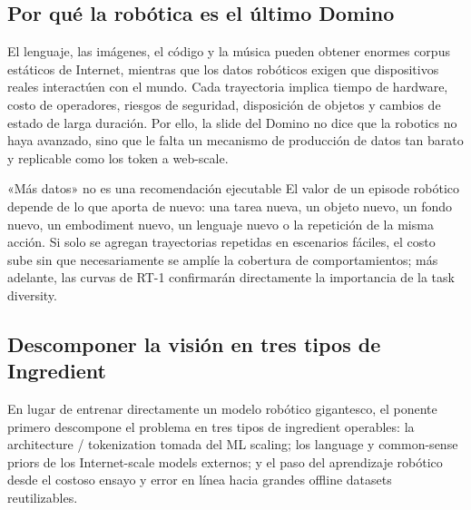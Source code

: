 
\subsection{Por qué la robótica es el último Domino}

El lenguaje, las imágenes, el código y la música pueden obtener enormes corpus estáticos de Internet, mientras que los datos robóticos exigen que dispositivos reales interactúen con el mundo. Cada trayectoria implica tiempo de hardware, costo de operadores, riesgos de seguridad, disposición de objetos y cambios de estado de larga duración. Por ello, la slide del Domino no dice que la robotics no haya avanzado, sino que le falta un mecanismo de producción de datos tan barato y replicable como los token a web-scale.


\begin{warningbox}{«Más datos» no es una recomendación ejecutable}
El valor de un episode robótico depende de lo que aporta de nuevo: una tarea nueva, un objeto nuevo, un fondo nuevo, un embodiment nuevo, un lenguaje nuevo o la repetición de la misma acción. Si solo se agregan trayectorias repetidas en escenarios fáciles, el costo sube sin que necesariamente se amplíe la cobertura de comportamientos; más adelante, las curvas de RT-1 confirmarán directamente la importancia de la task diversity.
\end{warningbox}

\subsection{Descomponer la visión en tres tipos de Ingredient}

En lugar de entrenar directamente un modelo robótico gigantesco, el ponente primero descompone el problema en tres tipos de ingredient operables: la architecture / tokenization tomada del ML scaling; los language y common-sense priors de los Internet-scale models externos; y el paso del aprendizaje robótico desde el costoso ensayo y error en línea hacia grandes offline datasets reutilizables.

